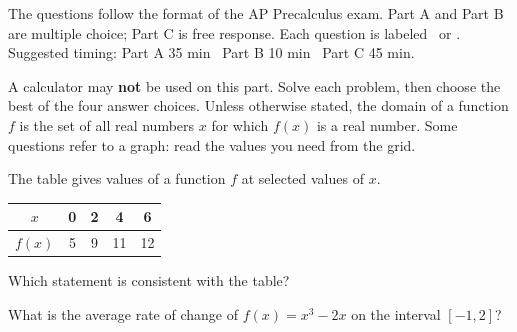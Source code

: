 \documentclass[11pt]{article}
\begin{document}

\begin{keyidea}
The questions follow the format of the AP Precalculus exam. Part A and Part B are multiple choice; Part C is free response. Each question is labeled \nocalctext\ or \calctext.\\
Suggested timing: Part A 35 min \textbullet\ Part B 10 min \textbullet\ Part C 45 min.
\end{keyidea}

\begin{directions}
A calculator may \textbf{not} be used on this part. Solve each problem, then choose the best of the four answer choices. Unless otherwise stated, the domain of a function $f$ is the set of all real numbers $x$ for which $f(x)$ is a real number. Some questions refer to a graph: read the values you need from the grid.
\end{directions}

\begin{exo}[1.1]{}
The table gives values of a function $f$ at selected values of $x$.
\begin{center}\begin{tabular}{c|cccc}
$x$ & 0 & 2 & 4 & 6\\\hline $f(x)$ & 5 & 9 & 11 & 12\end{tabular}\end{center}
Which statement is consistent with the table?
\end{exo}

\begin{exo}[1.2]{}
What is the average rate of change of $f(x)=x^3-2x$ on the interval $[-1,2]$?
\end{exo}
\end{document}
